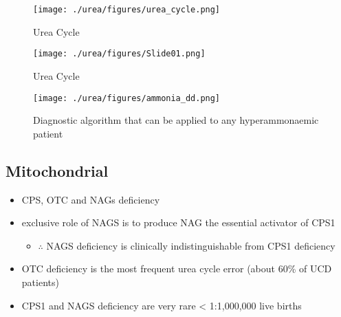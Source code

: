 \documentclass{scrartcl}
\begin{document}
\begin{figure}[htbp]
\centering
\texttt{[image: ./urea/figures/urea\_cycle.png]}
\caption{\label{fig:org4a48d07}
Urea Cycle}
\end{figure}


\begin{figure}[htbp]
\centering
\texttt{[image: ./urea/figures/Slide01.png]}
\caption{\label{fig:orgb3db281}
Urea Cycle}
\end{figure}


\begin{figure}[htbp]
\centering
\texttt{[image: ./urea/figures/ammonia\_dd.png]}
\caption{\label{fig:orgca2af59}
Diagnostic algorithm that can be applied to any hyperammonaemic patient}
\end{figure}

\subsection{Mitochondrial}
\label{sec:orgc6b5aab}
\begin{itemize}
\item CPS, OTC and NAGs deficiency
\item exclusive role of NAGS is to produce NAG the essential activator of CPS1
\begin{itemize}
\item \(\therefore\) NAGS deficiency is clinically indistinguishable from
CPS1 deficiency
\end{itemize}
\item OTC deficiency is the most frequent urea cycle error (about 60\% of UCD patients)
\item CPS1 and NAGS deficiency are very rare \textless{} 1:1,000,000 live births
\end{itemize}
\end{document}
